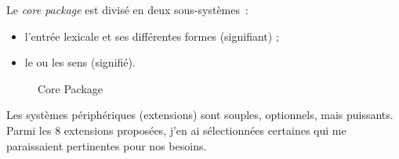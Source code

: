 \documentclass[a4paper,12pt]{article}
\begin{document}
\pagebreak %
Le \textit{core package} est divis\'e en deux sous-syst\`emes~:
\begin{itemize}
\item l'entr\'ee lexicale et ses diff\'erentes formes (signifiant) ;
\item le ou les sens (signifi\'e).
\end{itemize}

\begin{figure}[h]
\centerline{}
\caption{Core Package}
\end{figure}

\pagebreak %

Les syst\`emes p\'eriph\'eriques (extensions) sont souples, optionnels, mais puissants. Parmi les 8 extensions propos\'ees, j'en ai s\'electionn\'ees certaines qui me paraissaient pertinentes pour nos besoins.
\end{document}
